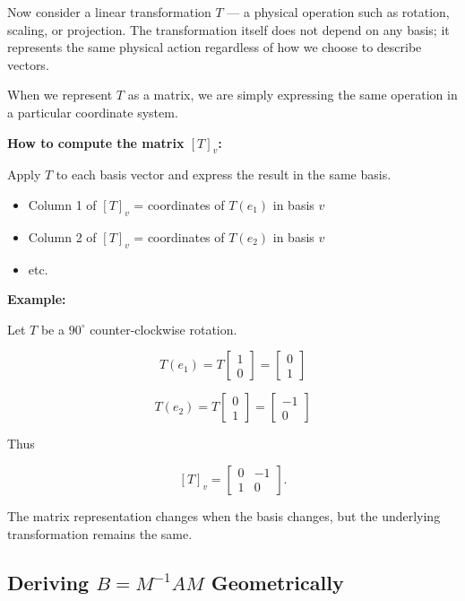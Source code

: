 Now consider a linear transformation $T$ — a physical operation such as
rotation, scaling, or projection. The transformation itself does not
depend on any basis; it represents the same physical action regardless
of how we choose to describe vectors.

When we represent $T$ as a matrix, we are simply expressing the same
operation in a particular coordinate system.

\textbf{How to compute the matrix $[T]_v$:}

Apply $T$ to each basis vector and express the result in the same basis.

\begin{itemize}
\item Column 1 of $[T]_v$ = coordinates of $T(e_1)$ in basis $v$
\item Column 2 of $[T]_v$ = coordinates of $T(e_2)$ in basis $v$
\item etc.
\end{itemize}

\textbf{Example:}

Let $T$ be a $90^\circ$ counter-clockwise rotation.

\[
T(e_1) =
T
\begin{bmatrix}
1\\0
\end{bmatrix}
=
\begin{bmatrix}
0\\1
\end{bmatrix}
\]

\[
T(e_2) =
T
\begin{bmatrix}
0\\1
\end{bmatrix}
=
\begin{bmatrix}
-1\\0
\end{bmatrix}
\]

Thus

\[
[T]_v =
\begin{bmatrix}
0 & -1 \\
1 & 0
\end{bmatrix}.
\]

The matrix representation changes when the basis changes, but the
underlying transformation remains the same.

\subsection{Deriving $B = M^{-1}AM$ Geometrically}
\label{sec:derive-similarity}

